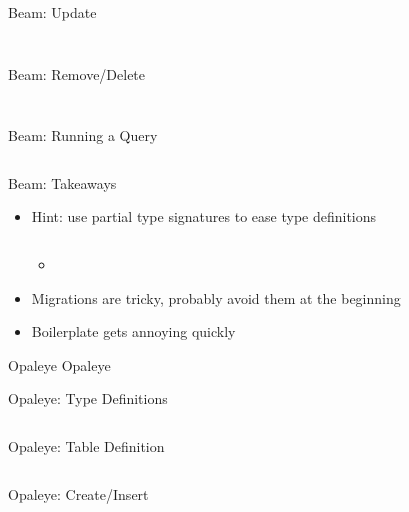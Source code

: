 \documentclass[hyperref={pdfpagelabels=false},12pt]{beamer}
\newcommand{\unnamedUrl}[1]{\href{#1}{\color{blue}{#1}}}
\newcommand{\pygment}[3]{
  \inputminted[frame=single,framesep=2mm,linenos,fontsize=#1]{#2}{#3}
}
\newcommand{\pygmentLines}[5]{
  \inputminted[frame=single,framesep=2mm,linenos,fontsize=#1,firstline=#2,lastline=#3,autogobble]{#4}{#5}
}
\begin{document}
\begin{frame}{Beam: Update}
  \pygmentLines{\scriptsize}{150}{159}{haskell}{code/beam/src/Person.hs}
  \pygment{\scriptsize}{sql}{code/sql/updateSetWhereEmail.sql}
\end{frame}

\begin{frame}{Beam: Remove/Delete}
  \pygmentLines{\scriptsize}{161}{168}{haskell}{code/beam/src/Person.hs}
  \pygment{\scriptsize}{sql}{code/sql/deleteWhere.sql}
\end{frame}

\begin{frame}{Beam: Running a Query}
  \pygmentLines{\scriptsize}{37}{42}{haskell}{code/beam/test/Spec.hs}
\end{frame}

\begin{frame}{Beam: Takeaways}
  \begin{itemize}
    \item Hint: use partial type signatures to ease type definitions
      \pygment{\scriptsize}{haskell}{code/partialTypeSigs.hs}
    \begin{itemize}
      \item \unnamedUrl{https://github.com/barrymoo/slurm-proposals/blob/master/src/Queries.hs\#L31}
    \end{itemize}
    \item Migrations are tricky, probably avoid them at the beginning
    \item Boilerplate gets annoying quickly
  \end{itemize}
\end{frame}

\begin{frame}{Opaleye}
  \centering \Huge Opaleye
\end{frame}

\begin{frame}{Opaleye: Type Definitions}
  \pygmentLines{\scriptsize}{42}{62}{haskell}{code/opaleye-example/src/Person.hs}
\end{frame}

\begin{frame}{Opaleye: Table Definition}
  \pygmentLines{\scriptsize}{66}{86}{haskell}{code/opaleye-example/src/Person.hs}
\end{frame}

\begin{frame}{Opaleye: Create/Insert}
  \pygmentLines{\scriptsize}{98}{111}{haskell}{code/opaleye-example/src/Person.hs}
  \pygment{\scriptsize}{sql}{code/sql/insertInto.sql}
\end{frame}
\end{document}
